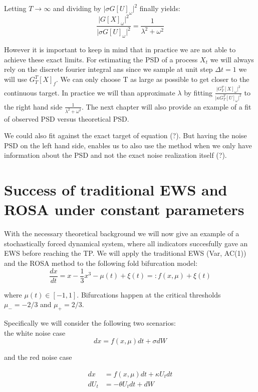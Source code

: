 \documentclass[%
thesis=student,%
coverpage=false,%
titlepage=false,%
headmarks=true, %
german,%
font=libertine, %
math=newpxtx, %
BCOR=5mm,%
coverBCOR=11mm%
]{tumbook}
\begin{document}
Letting $T \rightarrow \infty$ and dividing by $\lvert\sigma G[U]_{\omega}\rvert^2$ finally yields:
\[
    \frac{\lvert G[X]_{\omega} \rvert^2}{\lvert\sigma G[U]_{\omega}\rvert^2} = \frac{1}{\lambda^2 + \omega^2}
\]

However it is important to keep in mind that in practice we are not able to achieve these exact limits. For estimating the PSD of a process $X_{t}$ we will always rely on the discrete fourier integral ans since we sample at unit step $\Delta t = 1$ we will use $G_{T}^{T}[X]_{f}$. We can only choose T as large as possible to get closer to the continuous target. In practice we will than approximate $\lambda$ by fitting $\frac{\lvert G_{T}^{T}[X]_{\omega} \rvert ^2}{\lvert \kappa G_{T}^{T}[U]_{\omega} \rvert ^2}$ to the right hand side $\frac{1}{\lambda^2 + \omega^2}$. The next chapter will also provide an example of a fit of observed PSD versus theoretical PSD.


We could also fit against the exact target of equation (?). But having the noise PSD on the left hand side, enables us to also use the method when we only have information about the PSD and not the exact noise realization itself (?).



\chapter{Success of traditional EWS and ROSA under constant parameters}

With the necessary theoretical background we will now give an example of a stochastically forced dynamical system, where all indicators succesfully gave an EWS before reaching the TP.
We will apply the traditional EWS (Var, AC(1)) and the ROSA method to the following fold bifurcation model: 
        \[
            \frac{dx}{dt} = x - \frac{1}{3}x^3 - \mu(t) + \xi(t) =: f(x,\mu) + \xi(t)
        \]
        
where $\mu(t) \in [-1,1]$. Bifurcations happen at the critical thresholds $\mu_{-} = -2/3$ and $\mu_{+} = 2/3$.

Specifically we will consider the following two scenarios: \\
    the white noise case
    \[
    dx = f(x,\mu)dt + \sigma dW
    \]

and the red noise case
    
    \begin{align*}   
    dx & = f(x,\mu)dt + \kappa U_{t}dt \\
    dU_{t} & = -\theta U_{t} dt + dW
    \end{align*}
\end{document}

